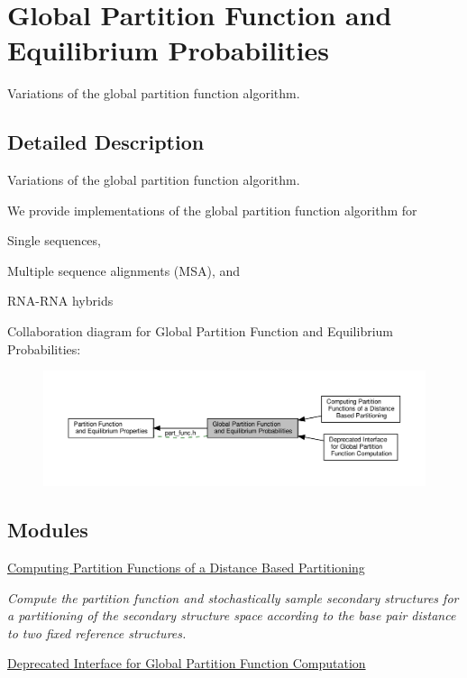 \hypertarget{group__part__func__global}{}\section{Global Partition Function and Equilibrium Probabilities}
\label{group__part__func__global}


Variations of the global partition function algorithm.  




\subsection{Detailed Description}
Variations of the global partition function algorithm. 

We provide implementations of the global partition function algorithm for
\begin{DoxyItemize}
\item Single sequences,
\item Multiple sequence alignments (M\+SA), and
\item R\+N\+A-\/\+R\+NA hybrids 
\end{DoxyItemize}Collaboration diagram for Global Partition Function and Equilibrium Probabilities\+:
\nopagebreak
\begin{figure}[H]
\begin{center}
\leavevmode
\includegraphics[width=350pt]{group__part__func__global}
\end{center}
\end{figure}
\subsection*{Modules}
\begin{DoxyCompactItemize}
\item 
\hyperlink{group__kl__neighborhood__pf}{Computing Partition Functions of a Distance Based Partitioning}
\begin{DoxyCompactList}\small\item\em Compute the partition function and stochastically sample secondary structures for a partitioning of the secondary structure space according to the base pair distance to two fixed reference structures. \end{DoxyCompactList}\item 
\hyperlink{group__part__func__global__deprecated}{Deprecated Interface for Global Partition Function Computation}
\end{DoxyCompactItemize}
